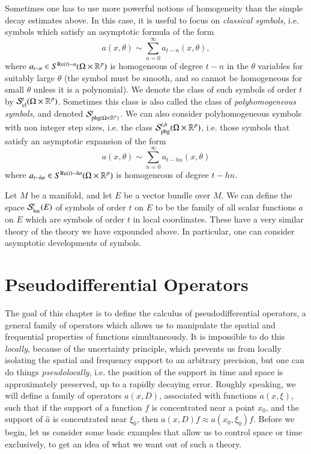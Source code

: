 Sometimes one has to use more powerful notions of homogeneity than the simple decay estimates above. In this case, it is useful to focus on \emph{classical symbols}, i.e. symbols which satisfy an asymptotic formula of the form
%
\[ a(x,\theta) \sim \sum_{n = 0}^\infty a_{t-n}(x,\theta), \]
%
where $a_{t-n} \in S^{\text{Re}(t) - n}(\Omega \times \operatorname{\mathbb{R}}^p)$ is homogeneous of degree $t-n$ in the $\theta$ variables for suitably large $\theta$ (the symbol must be smooth, and so cannot be homogeneous for small $\theta$ unless it is a polynomial). We denote the class of such symbols of order $t$ by $\mathcal{S}^t_{\text{cl}}(\Omega \times \operatorname{\mathbb{R}}^p)$. Sometimes this class is also called the class of \emph{polyhomogeneous symbols}, and denoted $\mathcal{S}^t_{\text{phg}(\Omega \times \operatorname{\mathbb{R}}^p)}$. We can also consider polyhomogeneous symbols with non integer step sizes, i.e. the class $\mathcal{S}^{t,h}_{\text{phg}}(\Omega \times \operatorname{\mathbb{R}}^p)$, i.e. those symbols that satisfy an asymptotic expansion of the form
%
\[ a(x,\theta) \sim \sum_{n = 0}^\infty a_{t - hn}(x,\theta) \]
%
where $a_{t-hn} \in S^{\text{Re}(t) - hn}(\Omega \times \operatorname{\mathbb{R}}^p)$ is homogeneous of degree $t-hn$.

\begin{remark}
    Let $M$ be a manifold, and let $E$ be a vector bundle over $M$. We can define the space $\mathcal{S}^t_{\text{loc}}(E)$ of symbols of order $t$ on $E$ to be the family of all scalar functions $a$ on $E$ which are symbols of order $t$ in local coordinates. These have a very similar theory of the theory we have expounded above. In particular, one can consider asymptotic developments of symbols.
\end{remark}












\chapter{Pseudodifferential Operators}

The goal of this chapter is to define the calculus of pseudodifferential operators, a general family of operators which allows us to manipulate the spatial and frequential properties of functions simultaneously. It is impossible to do this \emph{locally}, because of the uncertainty principle, which prevents us from locally isolating the spatial and frequency support to an arbitrary precision, but one can do things \emph{pseudolocally}, i.e. the position of the support in time and space is approximately preserved, up to a rapidly decaying error. Roughly speaking, we will define a family of operators $a(x,D)$, associated with functions $a(x,\xi)$, such that if the support of a function $f$ is concentrated near a point $x_0$, and the support of $\widehat{a}$ is concentrated near $\xi_0$, then $a(x,D) f \approx a(x_0,\xi_0) f$. Before we begin, let us consider some basic examples that allow us to control space or time exclusively, to get an idea of what we want out of such a theory.

